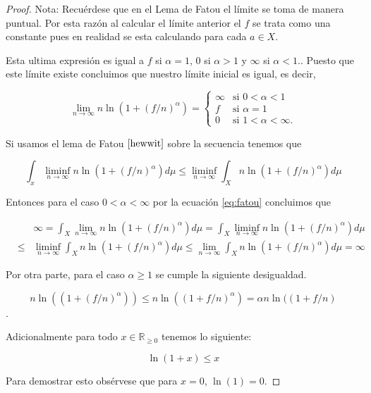 \documentclass[letter,twoside,12pt]{article}
\numberwithin{equation}{section}
\begin{document}
\begin{enumerate}[label = (\textbf{\arabic*.})]
\begin{proof}
Nota: Recuérdese que en el Lema de Fatou el límite se toma de manera puntual. Por esta razón al calcular el límite anterior el $f$ se trata como una constante pues en realidad se esta calculando para cada $a \in X$.

Esta ultima expresión es igual a $f$ si $\alpha = 1 $, 0 si $\alpha > 1$ y $\infty $ si $ \alpha<1. $. Puesto que este límite existe concluimos que nuestro límite inicial es igual, es decir,

\begin{equation}
\lim_{n \to \infty} n\ln(1+(f/n)^\alpha) = \left\{
	\begin{array}{ll}
		\infty  & \mbox{si } 0 < \alpha < 1 
		 \\ f & \mbox{si } \alpha = 1
		 \\ 0 & \mbox{si } 1 < \alpha < \infty.
	\end{array}
\right. \label{eq:lim}
\end{equation}

Si usamos el lema de Fatou $ \cite[12.23]{hewwit} $ sobre la secuencia tenemos que

\begin{equation} \label{eq:fatou}
 \int_x \liminf_{n \to \infty} n\ln(1+(f/n)^\alpha)d\mu \leq \liminf_{n \to \infty} \int_X n\ln(1+(f/n)^\alpha)d\mu
\end{equation}

Entonces para el caso $ 0 < \alpha < \infty $ por la ecuación \eqref{eq:fatou} concluimos que

\begin{eqnarray*}
& &\infty = \int_X \lim_{n \to \infty} n\ln(1+(f/n)^\alpha)d\mu = \int_X \liminf_{n \to \infty} n\ln(1+(f/n)^\alpha)d\mu
\\&\leq&  \liminf_{n \to \infty} \int_X n\ln(1+(f/n)^\alpha)d\mu \leq \lim_{n \to \infty} \int_X n\ln(1+(f/n)^\alpha)d\mu = \infty
\end{eqnarray*} 

Por otra parte, para el caso $ \alpha \geq 1 $ se cumple la siguiente desigualdad.

$$ n\ln((1+(f/n)^\alpha)) \leq n\ln((1+f/n)^\alpha) = \alpha n\ln((1+f/n) $$.

Adicionalmente para todo $x \in \mathbb{R}_{\geq0} $ tenemos lo siguiente:

\begin{equation}
\ln(1+x)\leq x \label{eq:ln}
\end{equation}

Para demostrar esto obsérvese que para $ x=0 $, $ \ln(1) = 0 $.


\end{proof}
\end{enumerate}
\end{document}
